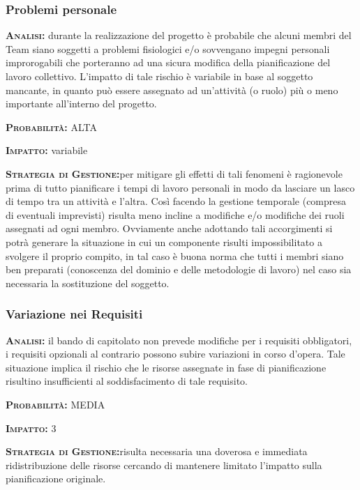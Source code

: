 \subsubsection{Problemi personale}
\begin{description}
	\item{\scshape\bfseries Analisi:} durante la realizzazione del progetto è probabile che alcuni membri del Team siano soggetti a problemi fisiologici e/o sovvengano impegni personali improrogabili che porteranno ad una sicura modifica della pianificazione del lavoro collettivo. L'impatto di tale rischio è variabile in base al soggetto mancante, in quanto può essere assegnato ad un'attività (o ruolo) più o meno importante all'interno del progetto.
	\item{\scshape\bfseries Probabilità:} ALTA
	\item{\scshape\bfseries Impatto:} variabile
	\item{\scshape\bfseries Strategia di Gestione:}per mitigare gli effetti di tali fenomeni è ragionevole prima di tutto pianificare i tempi di lavoro personali in modo da lasciare un lasco di tempo tra un attività e l'altra. Così facendo la gestione temporale (compresa di eventuali imprevisti) risulta meno incline a modifiche e/o modifiche dei ruoli assegnati ad ogni membro. Ovviamente anche adottando tali accorgimenti si potrà generare la situazione in cui un componente risulti impossibilitato a svolgere il proprio compito, in tal caso è buona norma che tutti i membri siano ben preparati (conoscenza del dominio e delle metodologie di lavoro) nel caso sia necessaria la sostituzione del soggetto.
\end{description}

\subsubsection{Variazione nei Requisiti}
\begin{description}
	\item{\scshape\bfseries Analisi:} il bando di capitolato non prevede modifiche per i requisiti obbligatori, i requisiti opzionali al contrario possono subire variazioni in corso d'opera. Tale situazione implica il rischio che le risorse assegnate in fase di pianificazione risultino insufficienti al soddisfacimento di tale requisito.
	\item{\scshape\bfseries Probabilità:} MEDIA
	\item{\scshape\bfseries Impatto:} 3
	\item{\scshape\bfseries Strategia di Gestione:}risulta necessaria una doverosa e immediata ridistribuzione delle risorse cercando di mantenere limitato l'impatto sulla pianificazione originale.
\end{description}

